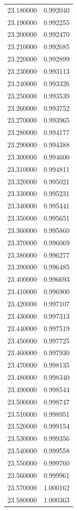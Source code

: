 \begin{tabular}{rr}
23.180000 & 0.992040 \\
23.190000 & 0.992255 \\
23.200000 & 0.992470 \\
23.210000 & 0.992685 \\
23.220000 & 0.992899 \\
23.230000 & 0.993113 \\
23.240000 & 0.993326 \\
23.250000 & 0.993539 \\
23.260000 & 0.993752 \\
23.270000 & 0.993965 \\
23.280000 & 0.994177 \\
23.290000 & 0.994388 \\
23.300000 & 0.994600 \\
23.310000 & 0.994811 \\
23.320000 & 0.995021 \\
23.330000 & 0.995231 \\
23.340000 & 0.995441 \\
23.350000 & 0.995651 \\
23.360000 & 0.995860 \\
23.370000 & 0.996069 \\
23.380000 & 0.996277 \\
23.390000 & 0.996485 \\
23.400000 & 0.996693 \\
23.410000 & 0.996900 \\
23.420000 & 0.997107 \\
23.430000 & 0.997313 \\
23.440000 & 0.997519 \\
23.450000 & 0.997725 \\
23.460000 & 0.997930 \\
23.470000 & 0.998135 \\
23.480000 & 0.998340 \\
23.490000 & 0.998544 \\
23.500000 & 0.998747 \\
23.510000 & 0.998951 \\
23.520000 & 0.999154 \\
23.530000 & 0.999356 \\
23.540000 & 0.999558 \\
23.550000 & 0.999760 \\
23.560000 & 0.999961 \\
23.570000 & 1.000162 \\
23.580000 & 1.000363 \\

\end{tabular}
